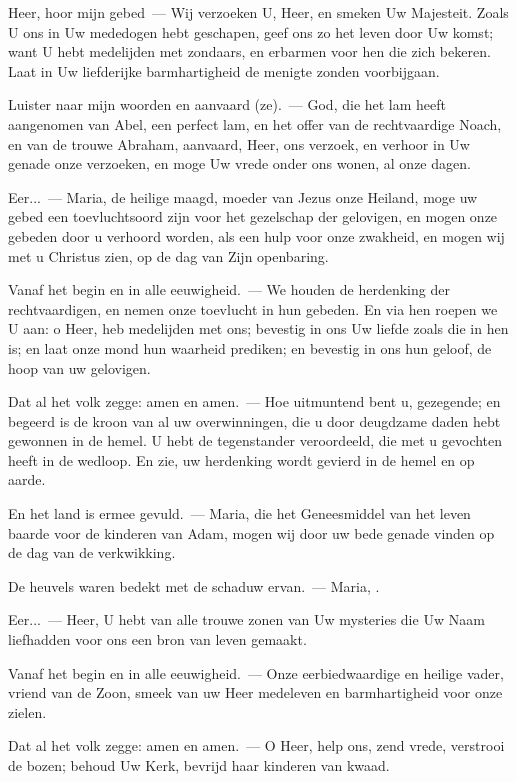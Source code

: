 \documentclass[12pt,twoside,a5paper]{article}
\begin{document}
\begin{halfparskip}
   Heer, hoor mijn gebed~--- Wij verzoeken U, Heer, en smeken Uw Majesteit. Zoals U ons in Uw mededogen hebt geschapen, geef ons zo het leven door Uw komst; want U hebt medelijden met zondaars, en erbarmen voor hen die zich bekeren. Laat in Uw liefderijke barmhartigheid de menigte zonden voorbijgaan.

  Luister naar mijn woorden en aanvaard (ze).~--- God, die het lam heeft aangenomen van Abel, een perfect lam, en het offer van de rechtvaardige Noach, en van de trouwe Abraham, aanvaard, Heer, ons verzoek, en verhoor in Uw genade onze verzoeken, en moge Uw vrede onder ons wonen, al onze dagen.

  Eer...~--- Maria, de heilige maagd, moeder van Jezus onze Heiland, moge uw gebed een toevluchtsoord zijn voor het gezelschap der gelovigen, en mogen onze gebeden door u verhoord worden, als een hulp voor onze zwakheid, en mogen wij met u Christus zien, op de dag van Zijn openbaring.

  Vanaf het begin en in alle eeuwigheid.~--- We houden de herdenking der rechtvaardigen, en nemen onze toevlucht in hun gebeden. En via hen roepen we U aan: o Heer, heb medelijden met ons; bevestig in ons Uw liefde zoals die in hen is; en laat onze mond hun waarheid prediken; en bevestig in ons hun geloof, de hoop van uw gelovigen.

  Dat al het volk zegge: amen en amen.~--- Hoe uitmuntend bent u, gezegende; en begeerd is de kroon van al uw overwinningen, die u door deugdzame daden hebt gewonnen in de hemel. U hebt de tegenstander veroordeeld, die met u gevochten heeft in de wedloop. En zie, uw herdenking wordt gevierd in de hemel en op aarde.
\end{halfparskip}

\begin{halfparskip}
   En het land is ermee gevuld.~--- Maria, die het Geneesmiddel van het leven baarde voor de kinderen van Adam, mogen wij door uw bede genade vinden op de dag van de verkwikking.

  De heuvels waren bedekt met de schaduw ervan.~--- Maria, .

  Eer...~--- Heer, U hebt van alle trouwe zonen van Uw mysteries die Uw Naam liefhadden voor ons een bron van leven gemaakt.

  Vanaf het begin en in alle eeuwigheid.~--- Onze eerbiedwaardige en heilige vader, vriend van de Zoon, smeek van uw Heer medeleven en barmhartigheid voor onze zielen.

  Dat al het volk zegge: amen en amen.~--- O Heer, help ons, zend vrede, verstrooi de bozen; behoud Uw Kerk, bevrijd haar kinderen van kwaad.
\end{halfparskip}
\end{document}
